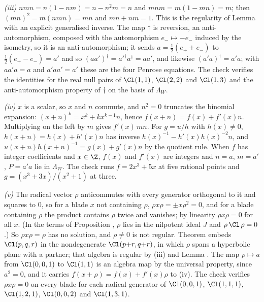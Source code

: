 \emph{(iii)} $nmn = n(1 - nm) = n - n^{2}m = n$ and $mnm = m(1 - mn) = m$; then $(mn)^{2} = m(nmn) = mn$ and $mn + nm = 1$. This is the regularity of Lemma  with an explicit generalised inverse. The map $\dagger$ is reversion, an anti-automorphism, composed with the automorphism $e_{-} \mapsto -e_{-}$ induced by the isometry, so it is an anti-automorphism; it sends $a = \tfrac12(e_{+} + e_{-})$ to $\tfrac12(e_{+} - e_{-}) = a'$ and so $(aa')^{\dagger} = a'^{\dagger}a^{\dagger} = aa'$, and likewise $(a'a)^{\dagger} = a'a$; with $aa'a = a$ and $a'aa' = a'$ these are the four Penrose equations. The check verifies the identities for the real null pairs of $\Cl(1,1)$, $\Cl(2,2)$ and $\Cl(1,3)$ and the anti-automorphism property of $\dagger$ on the basis of $\Lambda_{W}$.

\emph{(iv)} $x$ is a scalar, so $x$ and $n$ commute, and $n^{2} = 0$ truncates the binomial expansion: $(x + n)^{k} = x^{k} + kx^{k-1}n$, hence $f(x + n) = f(x) + f'(x)n$. Multiplying on the left by $m$ gives $f'(x)\,mn$. For $g = u/h$ with $h(x) \ne 0$, $h(x + n) = h(x) + h'(x)n$ has inverse $h(x)^{-1} - h'(x)h(x)^{-2}n$, and $u(x + n)h(x + n)^{-1} = g(x) + g'(x)n$ by the quotient rule. When $f$ has integer coefficients and $x \in \Z$, $f(x)$ and $f'(x)$ are integers and $n = a$, $m = a'$, $P = a'a$ lie in $\Lambda_{W}$. The check runs $f = 2x^{3} + 5x$ at five rational points and $g = (x^{3} + 3x)/(x^{2} + 1)$ at three.

\emph{(v)} The radical vector $\rho$ anticommutes with every generator orthogonal to it and squares to $0$, so for a blade $x$ not containing $\rho$, $\rho x \rho = \pm x\rho^{2} = 0$, and for a blade containing $\rho$ the product contains $\rho$ twice and vanishes; by linearity $\rho x \rho = 0$ for all $x$. (In the terms of Proposition , $\rho$ lies in the nilpotent ideal $J$ and $\rho\,\Cl\,\rho = 0$.) So $\rho x \rho = \rho$ has no solution, and $\rho \ne 0$ is not regular. Theorem  embeds $\Cl(p,q,r)$ in the nondegenerate $\Cl(p{+}r, q{+}r)$, in which $\rho$ spans a hyperbolic plane with a partner; that algebra is regular by (iii) and Lemma . The map $\rho \mapsto a$ from $\Cl(0,0,1)$ to $\Cl(1,1)$ is an algebra map by the universal property, since $a^{2} = 0$, and it carries $f(x + \rho) = f(x) + f'(x)\rho$ to (iv). The check verifies $\rho x \rho = 0$ on every blade for each radical generator of $\Cl(0,0,1)$, $\Cl(1,1,1)$, $\Cl(1,2,1)$, $\Cl(0,0,2)$ and $\Cl(1,3,1)$.
